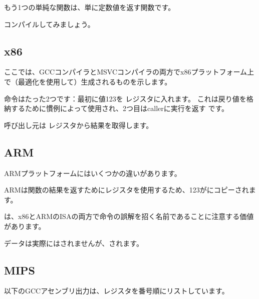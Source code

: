 \label{ret_val_func}

もう1つの単純な関数は、単に定数値を返す関数です。



コンパイルしてみましょう。

\subsection{x86}

ここでは、GCCコンパイラとMSVCコンパイラの両方でx86プラットフォーム上で（最適化を使用して）生成されるものを示します。



命令はたった2つです：最初に値123を \EAX レジスタに入れます。
これは戻り値を格納するために慣例によって使用され、2つ目は\gls{caller}に実行を返す \RET です。

呼び出し元は \EAX レジスタから結果を取得します。

\subsection{ARM}

ARMプラットフォームにはいくつかの違いがあります。



ARMは関数の結果を返すためにレジスタを使用するため、123がにコピーされます。

\MOV は、x86とARMの\ac{ISA}の両方で命令の誤解を招く名前であることに注意する価値があります。 

データは実際にはされませんが、されます。

\subsection{MIPS}

\label{MIPS_leaf_function_ex1}

以下のGCCアセンブリ出力は、レジスタを番号順にリストしています。




